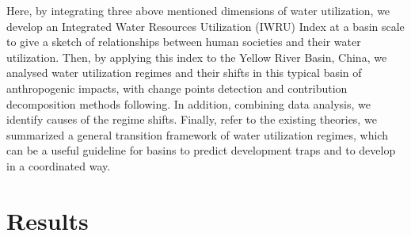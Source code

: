 \documentclass[9pt, twocolumn, twoside, lineno]{pnas-new}
\begin{document}
Here, by integrating three above mentioned dimensions of water utilization, we develop an Integrated Water Resources Utilization (IWRU) Index at a basin scale to give a sketch of relationships between human societies and their water utilization.
Then, by applying this index to the Yellow River Basin, China, we analysed water utilization regimes and their shifts in this typical basin of anthropogenic impacts, with change points detection and contribution decomposition methods following.
In addition, combining data analysis, we identify causes of the regime shifts. 
Finally, refer to the existing theories, we summarized a general transition framework of water utilization regimes, which can be a useful guideline for basins to predict development traps and to develop in a coordinated way.


\section*{Results}
\end{document}
